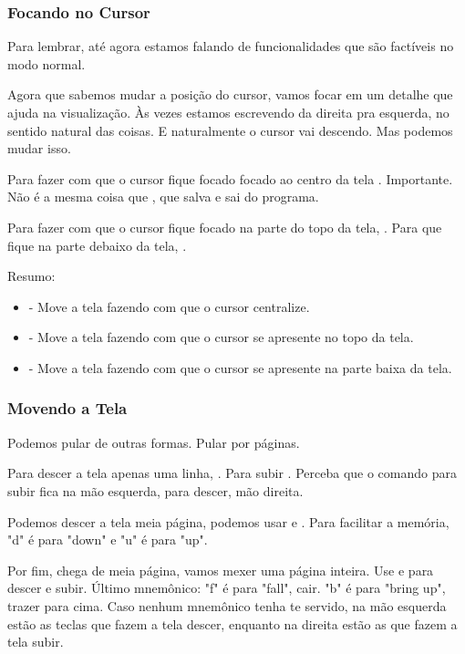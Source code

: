 \subsubsection{Focando no Cursor}
Para lembrar, até agora estamos falando de funcionalidades que são factíveis no modo normal.

Agora que sabemos mudar a posição do cursor, vamos focar em um detalhe que ajuda na visualização.
Às vezes estamos escrevendo da direita pra esquerda, no sentido natural das coisas.
E naturalmente o cursor vai descendo.
Mas podemos mudar isso.

Para fazer com que o cursor fique focado focado ao centro da tela .
Importante. Não é a mesma coisa que , que salva e sai do programa.

Para fazer com que o cursor fique focado na parte do topo da tela, .
Para que fique na parte debaixo da tela, .

Resumo:
\begin{itemize}
    \item {} - Move a tela fazendo com que o cursor centralize.
    \item {} - Move a tela fazendo com que o cursor se apresente no topo da tela.
    \item {} - Move a tela fazendo com que o cursor se apresente na parte baixa da tela.
\end{itemize}

\subsubsection{Movendo a Tela}
Podemos pular de outras formas. Pular por páginas.

Para descer a tela apenas uma linha, . Para subir .
Perceba que o comando para subir fica na mão esquerda, para descer, mão direita.

Podemos descer a tela meia página, podemos usar  e .
Para facilitar a memória, "d" é para "down" e "u" é para "up".

Por fim, chega de meia página, vamos mexer uma página inteira.
Use  e  para descer e subir.
Último mnemônico: "f" é para "fall", cair.
"b" é para "bring up", trazer para cima.
Caso nenhum mnemônico tenha te servido,
na mão esquerda estão as teclas que fazem a tela descer,
enquanto na direita estão as que fazem a tela subir.

